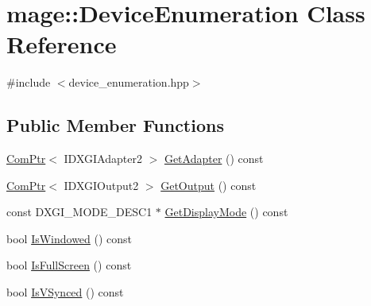 \hypertarget{classmage_1_1_device_enumeration}{}\section{mage\+:\+:Device\+Enumeration Class Reference}
\label{classmage_1_1_device_enumeration}


{\ttfamily \#include $<$device\+\_\+enumeration.\+hpp$>$}

\subsection*{Public Member Functions}
\begin{DoxyCompactItemize}
\item 
\hyperlink{namespacemage_ae74f374780900893caa5555d1031fd79}{Com\+Ptr}$<$ I\+D\+X\+G\+I\+Adapter2 $>$ \hyperlink{classmage_1_1_device_enumeration_ad8a0702abdc70ea8fc1b6e46544839a1}{Get\+Adapter} () const
\item 
\hyperlink{namespacemage_ae74f374780900893caa5555d1031fd79}{Com\+Ptr}$<$ I\+D\+X\+G\+I\+Output2 $>$ \hyperlink{classmage_1_1_device_enumeration_ac3958dd53d2fdb8ff645d8dca6dc5fdd}{Get\+Output} () const
\item 
const D\+X\+G\+I\+\_\+\+M\+O\+D\+E\+\_\+\+D\+E\+S\+C1 $\ast$ \hyperlink{classmage_1_1_device_enumeration_a533ac2f6ea91604a3ea3cc8d93c3de87}{Get\+Display\+Mode} () const
\item 
bool \hyperlink{classmage_1_1_device_enumeration_a51479c8c85b286f78730c5622604e524}{Is\+Windowed} () const
\item 
bool \hyperlink{classmage_1_1_device_enumeration_a8957ecacc567708e80694b25aa141c4e}{Is\+Full\+Screen} () const
\item 
bool \hyperlink{classmage_1_1_device_enumeration_a035e2430142e4e4ffcbc712f83e1e7e0}{Is\+V\+Synced} () const
\end{DoxyCompactItemize}

